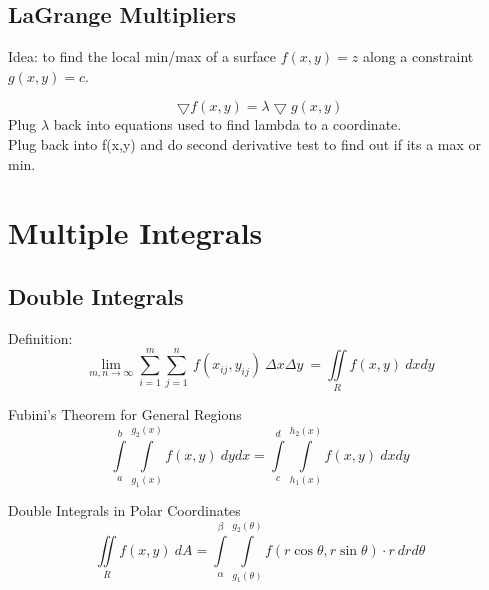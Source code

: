 \documentclass[12pt]{article}
\numberwithin{equation}{subsection}
\begin{document}
\begin{flushleft}
\subsection{LaGrange Multipliers}
Idea: to find the local min/max of a surface $f(x,y)=z$ along a constraint $g(x,y)=c$.

\begin{equation}
\bigtriangledown f(x,y)= \lambda \bigtriangledown g(x,y)
\end{equation}
Plug $\lambda$ back into equations used to find lambda to a coordinate.\\
Plug back into f(x,y) and do second derivative test to find out if its a max or min.




\newpage
\section{Multiple Integrals}
\subsection{Double Integrals}
Definition:
\begin{equation}
\lim_{m,n \rightarrow \infty }\sum_{i=1}^m \sum_{j=1}^n\ f(x_{ij}, y_{ij})\ \Delta x \Delta y\ = \iint \limits_R  f(x,y)\ dxdy 
\end{equation}

Fubini's Theorem for General Regions
\begin{equation}
\int \limits_a^b \int \limits_{g_1(x)}^{g_2(x)} f(x,y)\ dydx = \int \limits_c^d \int \limits_{h_1(x)}^{h_2(x)} f(x,y)\ dxdy
\end{equation}

Double Integrals in Polar Coordinates
\begin{equation}
\iint \limits_R  f(x,y)\ dA = \int \limits_\alpha^\beta \int \limits_{g_1(\theta)}^{g_2(\theta)} f(r\cos \theta, r\sin \theta) \cdot r\ drd\theta 
\end{equation}


\end{flushleft}
\end{document}
